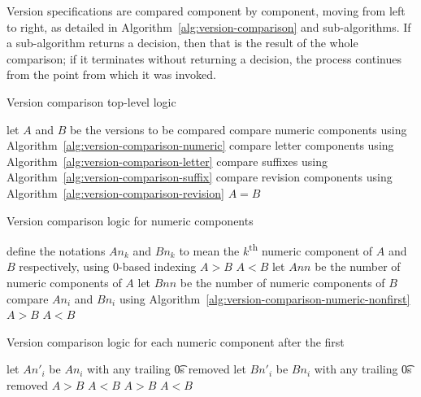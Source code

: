 Version specifications are compared component by component, moving from left to right,
as detailed in Algorithm~\ref{alg:version-comparison} and sub-algorithms.
If a sub-algorithm returns a decision, then that is the result of the whole comparison;
if it terminates without returning a decision, the process continues from the point
from which it was invoked.

\begin{algorithm}
\caption{Version comparison top-level logic} \label{alg:version-comparison}
\begin{algorithmic}[1]
    \STATE let $A$ and $B$ be the versions to be compared
    \STATE compare numeric components using Algorithm~\ref{alg:version-comparison-numeric}
    \STATE compare letter components using Algorithm~\ref{alg:version-comparison-letter}
    \STATE compare suffixes using Algorithm~\ref{alg:version-comparison-suffix}
    \STATE compare revision components using Algorithm~\ref{alg:version-comparison-revision}
    \RETURN $A=B$
\end{algorithmic}
\end{algorithm}

\begin{algorithm}
\caption{Version comparison logic for numeric components} \label{alg:version-comparison-numeric}
\begin{algorithmic}[1]
  \STATE define the notations $An_k$ and $Bn_k$ to mean the $k$\textsuperscript{th} numeric component of $A$ and $B$ respectively, using $0$-based indexing
    \RETURN $A>B$
    \RETURN $A<B$
  \ENDIF
  \STATE let $Ann$ be the number of numeric components of $A$
  \STATE let $Bnn$ be the number of numeric components of $B$
    \STATE compare $An_i$ and $Bn_i$ using Algorithm~\ref{alg:version-comparison-numeric-nonfirst}
  \ENDFOR
    \RETURN $A>B$
    \RETURN $A<B$
  \ENDIF
\end{algorithmic}
\end{algorithm}

\begin{algorithm}
\caption{Version comparison logic for each numeric component after the first} \label{alg:version-comparison-numeric-nonfirst}
\begin{algorithmic}[1]
    \STATE let $An'_i$ be $An_i$ with any trailing \t{0}s removed
    \STATE let $Bn'_i$ be $Bn_i$ with any trailing \t{0}s removed
      \RETURN $A>B$
      \RETURN $A<B$
    \ENDIF
  \ELSE
      \RETURN $A>B$
      \RETURN $A<B$
    \ENDIF
  \ENDIF
\end{algorithmic}
\end{algorithm}

